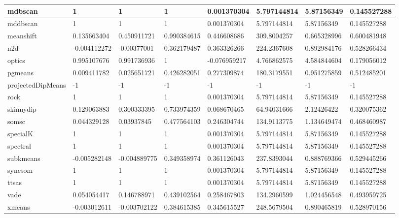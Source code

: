 \begin{table}[H]
\begin{tabular}{|l|l|l|l|l|l|l|l|}
\hline
mdbscan & 1 & 1 & 1 & 0.001370304 & 5.797144814 & 5.87156349 & 0.145527288 \\
\hline
mddbscan & 1 & 1 & 1 & 0.001370304 & 5.797144814 & 5.87156349 & 0.145527288 \\
\hline
meanshift & 0.135663404 & 0.450911721 & 0.990384615 & 0.446608686 & 309.8004257 & 0.665328996 & 0.600481948 \\
\hline
n2d & -0.004112272 & -0.00377001 & 0.362179487 & 0.363326266 & 224.2367608 & 0.892984176 & 0.528266434 \\
\hline
optics & 0.995107676 & 0.991736936 & 1 & -0.076959217 & 4.766862575 & 4.584844604 & 0.179056012 \\
\hline
pgmeans & 0.009411782 & 0.025651721 & 0.426282051 & 0.277309874 & 180.3179551 & 0.951275859 & 0.512485201 \\
\hline
projectedDipMeans & -1 & -1 & -1 & -1 & -1 & -1 & -1 \\
\hline
rock & 1 & 1 & 1 & 0.001370304 & 5.797144814 & 5.87156349 & 0.145527288 \\
\hline
skinnydip & 0.129063883 & 0.300333395 & 0.733974359 & 0.068670465 & 64.94031666 & 2.12426422 & 0.320075362 \\
\hline
somsc & 0.044329128 & 0.03937845 & 0.477564103 & 0.246304744 & 134.9113775 & 1.134649474 & 0.468460987 \\
\hline
specialK & 1 & 1 & 1 & 0.001370304 & 5.797144814 & 5.87156349 & 0.145527288 \\
\hline
spectral & 1 & 1 & 1 & 0.001370304 & 5.797144814 & 5.87156349 & 0.145527288 \\
\hline
subkmeans & -0.005282148 & -0.004889775 & 0.349358974 & 0.361126043 & 237.8393044 & 0.888769366 & 0.529445266 \\
\hline
syncsom & 1 & 1 & 1 & 0.001370304 & 5.797144814 & 5.87156349 & 0.145527288 \\
\hline
ttsas & 1 & 1 & 1 & 0.001370304 & 5.797144814 & 5.87156349 & 0.145527288 \\
\hline
vade & 0.054054417 & 0.146788971 & 0.439102564 & 0.258467803 & 134.2960599 & 1.024456548 & 0.493959725 \\
\hline
xmeans & -0.003012611 & -0.003702122 & 0.384615385 & 0.345615527 & 248.5679504 & 0.890465819 & 0.528970156 \\
\hline
\end{tabular}
\end{table}

\clearpage

